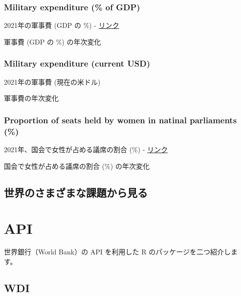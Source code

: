 \documentclass[
  xelatex, ja=standard]{bxjsbook}
\theoremstyle{definition}
\theoremstyle{definition}
\theoremstyle{definition}
\theoremstyle{definition}
\theoremstyle{remark}
\begin{document}
\hypertarget{military-expenditure-of-gdp}{%
\subsubsection{Military expenditure (\% of GDP)}\label{military-expenditure-of-gdp}}

2021年の軍事費 (GDP の \%) - \href{https://data.worldbank.org/indicator/MS.MIL.XPND.GD.ZS?locations=JP-GB-RU-FR-CN-UA\&start=2021\&end=2021\&view=bar}{リンク}

軍事費 (GDP の \%) の年次変化

\hypertarget{military-expenditure-current-usd}{%
\subsubsection{Military expenditure (current USD)}\label{military-expenditure-current-usd}}

2021年の軍事費 (現在の米ドル)

軍事費の年次変化

\hypertarget{proportion-of-seats-held-by-women-in-natinal-parliaments}{%
\subsubsection{Proportion of seats held by women in natinal parliaments (\%)}\label{proportion-of-seats-held-by-women-in-natinal-parliaments}}

2021年、国会で女性が占める議席の割合 (\%) - \href{https://data.worldbank.org/indicator/SG.GEN.PARL.ZS?locations=JP-GB-RU-FR-CN-US-UA-DE\&start=2021\&end=2021\&view=bar}{リンク}

国会で女性が占める議席の割合 (\%) の年次変化

\hypertarget{ux4e16ux754cux306eux3055ux307eux3056ux307eux306aux8ab2ux984cux304bux3089ux898bux308b}{%
\subsection{世界のさまざまな課題から見る}\label{ux4e16ux754cux306eux3055ux307eux3056ux307eux306aux8ab2ux984cux304bux3089ux898bux308b}}

\hypertarget{api}{%
\section{API}\label{api}}

世界銀行（World Bank）の API を利用した R のパッケージを二つ紹介します。

\hypertarget{wdi}{%
\subsection{WDI}\label{wdi}}
\end{document}
